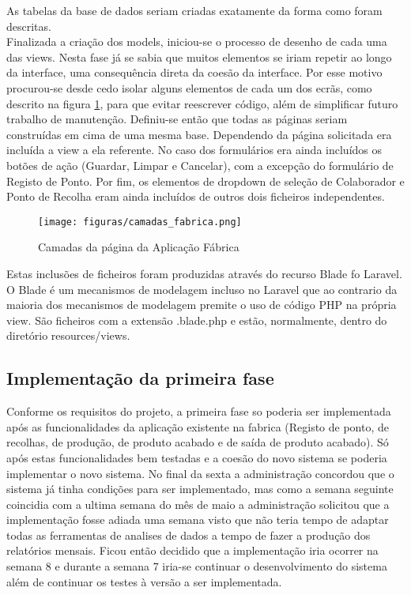 \noindent
As tabelas da base de dados seriam criadas exatamente da forma como foram descritas.\\
Finalizada a criação dos models, iniciou-se o processo de desenho de cada uma das views. Nesta fase já se sabia que muitos elementos se iriam repetir ao longo da interface, uma consequência direta da coesão da interface. Por esse motivo procurou-se desde cedo isolar alguns elementos de cada um dos ecrãs, como descrito na figura \ref{fig:ui_fabrica_camadas}, para que evitar reescrever código, além de simplificar futuro trabalho de manutenção. Definiu-se então que todas as páginas seriam construídas em cima de uma mesma base. Dependendo da página solicitada era incluída a view a ela referente. No caso dos formulários era ainda incluídos os botões de ação (Guardar, Limpar e Cancelar), com a excepção do formulário de Registo de Ponto. Por fim, os elementos de dropdown de seleção de Colaborador e Ponto de Recolha eram ainda incluídos de outros dois ficheiros independentes. 
\begin{figure}[htbp] 
	\begin{center}
		\texttt{[image: figuras/camadas\_fabrica.png]}
		\caption{Camadas da página da Aplicação Fábrica}
		\label{fig:ui_fabrica_camadas} 
	\end{center}
\end{figure}

\noindent
Estas inclusões de ficheiros foram produzidas através do recurso Blade fo Laravel. O Blade é um mecanismos de modelagem incluso no Laravel que ao contrario da maioria dos mecanismos de modelagem premite o uso de código PHP na própria view. São ficheiros com a extensão .blade.php e estão, normalmente, dentro do diretório resources/views\cite{Laravel}.

\subsection{Implementação da primeira fase}
Conforme os requisitos do projeto, a primeira fase so poderia ser implementada após as funcionalidades da aplicação existente na fabrica (Registo de ponto, de recolhas, de produção, de produto acabado e de saída de produto acabado). Só após estas funcionalidades bem testadas e a coesão do novo sistema se poderia implementar o novo sistema. No final da sexta a administração concordou que o sistema já tinha condições para ser implementado, mas como a semana seguinte coincidia com a ultima semana do mês de maio a administração solicitou que a implementação fosse adiada uma semana visto que não teria tempo de adaptar todas as ferramentas de analises de dados a tempo de fazer a produção dos relatórios mensais. Ficou então decidido que a implementação iria ocorrer na semana 8 e durante a semana 7 iria-se continuar o desenvolvimento do sistema além de continuar os testes à versão a ser implementada.  